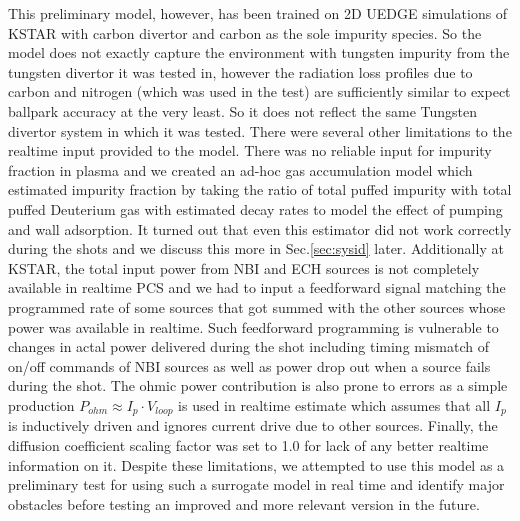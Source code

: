 This preliminary model, however, has been trained on 2D UEDGE simulations of KSTAR with carbon divertor and carbon as the sole impurity species.
So the model does not exactly capture the environment with tungsten impurity from the tungsten divertor it was tested in, however the radiation loss profiles due to carbon and nitrogen (which was used in the test) are sufficiently similar to expect ballpark accuracy at the very least.
So it does not reflect the same Tungsten divertor system in which it was tested.
There were several other limitations to the realtime input provided to the model.
There was no reliable input for impurity fraction in plasma and we created an ad-hoc gas accumulation model which estimated impurity fraction by taking the ratio of total puffed impurity with total puffed Deuterium gas with estimated decay rates to model the effect of pumping and wall adsorption.
It turned out that even this estimator did not work correctly during the shots and we discuss this more in Sec.\ref{sec:sysid} later.
Additionally at KSTAR, the total input power from NBI and ECH sources is not completely available in realtime PCS and we had to input a feedforward signal matching the programmed rate of some sources that got summed with the other sources whose power was available in realtime.
Such feedforward programming is vulnerable to changes in actal power delivered during the shot including timing mismatch of on/off commands of NBI sources as well as power drop out when a source fails during the shot.
The ohmic power contribution is also prone to errors as a simple production $P_{ohm} \approx I_p \cdot V_{loop}$ is used in realtime estimate which assumes that all $I_p$ is inductively driven and ignores current drive due to other sources.
Finally, the diffusion coefficient scaling factor was set to 1.0 for lack of any better realtime information on it.
Despite these limitations, we attempted to use this model as a preliminary test for using such a surrogate model in real time and identify major obstacles before testing an improved and more relevant version in the future.
